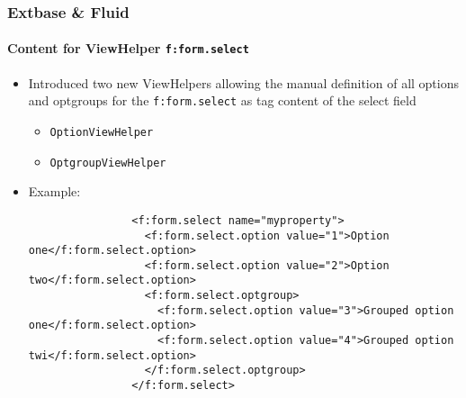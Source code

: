 \begin{frame}[fragile]
	\frametitle{Extbase \& Fluid}
	\framesubtitle{Content for ViewHelper \texttt{f:form.select}}

	\lstset{basicstyle=\tiny\ttfamily}

	\begin{itemize}
		\item Introduced two new ViewHelpers allowing the manual definition of all options and
		    optgroups for the \texttt{f:form.select} as tag content of the select field

			\begin{itemize}
				\item \texttt{OptionViewHelper}
				\item \texttt{OptgroupViewHelper}
			\end{itemize}

		\item Example:

			\begin{lstlisting}
				<f:form.select name="myproperty">
				  <f:form.select.option value="1">Option one</f:form.select.option>
				  <f:form.select.option value="2">Option two</f:form.select.option>
				  <f:form.select.optgroup>
				    <f:form.select.option value="3">Grouped option one</f:form.select.option>
				    <f:form.select.option value="4">Grouped option twi</f:form.select.option>
				  </f:form.select.optgroup>
				</f:form.select>
			\end{lstlisting}

		\end{itemize}

\end{frame}


